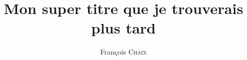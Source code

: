 \usepackage[francais]{babel}
\usepackage{fontspec}
    \setmainfont[%
	Numbers=OldStyle,
	Ligatures={
		TeX,
		Common,
		Rare,
		Historical
		}
	]{Linux Libertine O}
    \setsansfont{Linux Biolinum O}


\usepackage[%
    hidelinks=true
    colorlinks=false
    pdfauthor={François Chaix},
    pdftitle={Document de travail — recherches biblio François Chaix},
    pdfdisplaydoctitle=true, %
    pdfsubject={plop},
    pdfkeywords={plop},
    pdfproducer={LuaTeX, avec le package hyperref},
    pdfcreator={LuaTex},
    linktocpage=false,
    pdfinfo={pouet ?},
    pdflang={fr-FR},
    unicode=true,
    verbose=true
    ]{hyperref}

\usepackage{lipsum}



\usepackage[
	natbib=true,
	backend=biber
	]{biblatex}


\title{Mon super titre que je trouverais plus tard}
\author{François \textsc{Chaix}}
